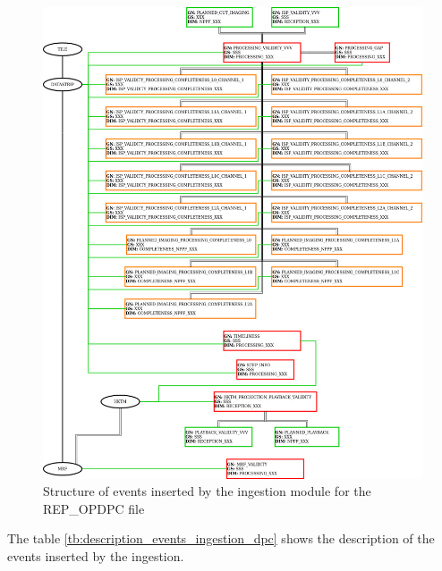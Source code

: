 \begin{figure}[H]
  \begin{center}
	\centering\includegraphics[width=150mm]{../fig/structure_ingestion_dpc_events.png}
	\caption{Structure of events inserted by the ingestion module for the REP\_OPDPC file}
	\label{fg:structure_ingestion_dpc_events}
  \end{center}
\end{figure}

The table \ref{tb:description_events_ingestion_dpc} shows the description of the events inserted by the ingestion.

